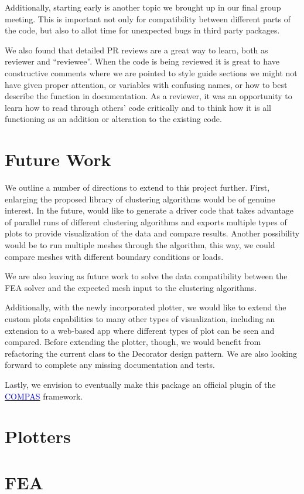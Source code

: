 \documentclass[11pt]{article}
\begin{document}
Additionally, starting early is another topic we brought up in our final group meeting. This is important not only for compatibility between different parts of the code, but also to allot time for unexpected bugs in third party packages.

We also found that detailed PR reviews are a great way to learn, both as reviewer and “reviewee”. When the code is being reviewed it is great to have constructive comments where we are pointed to style guide sections we might not have given proper attention, or variables with confusing names, or how to best describe the function in documentation. As a reviewer, it was an opportunity to learn how to read through others’ code critically and to think how it is all functioning as an addition or alteration to the existing code.


\section{Future Work}

We outline a number of directions to extend to this project further. First, enlarging the proposed library of clustering algorithms would be of genuine interest. In the future, would like to generate a driver code that takes advantage of parallel runs of different clustering algorithms and exports multiple types of plots to provide visualization of the data and compare results. Another possibility would be to run multiple meshes through the algorithm, this way, we could compare meshes with different boundary conditions or loads.

We are also leaving as future work to solve the data compatibility between the FEA solver and the expected mesh input to the clustering algorithms. 

Additionally, with the newly incorporated plotter, we would like to extend the custom plots capabilities to many other types of visualization, including an extension to a web-based app where different types of plot can be seen and compared.
Before extending the plotter, though, we would benefit from refactoring the current class to the Decorator design pattern. 
We are also looking forward to complete any missing documentation and tests.

Lastly, we envision to eventually make this package an official plugin of the \href{http://www.compas.dev}{\textcolor{blue}{COMPAS}} framework.


\clearpage
\appendix

\section{Plotters}
\label{appendix:a}


\section{FEA}
\label{appendix:b}

\end{document}
